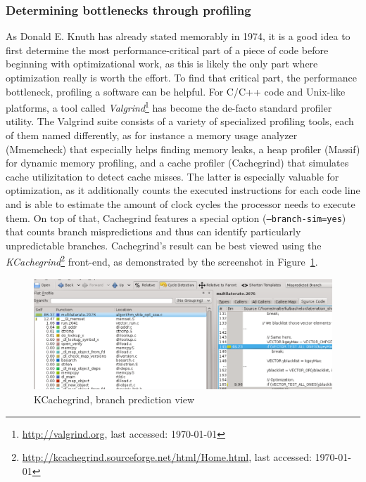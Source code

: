 \subsubsection{Determining bottlenecks through profiling}
As Donald E. Knuth has already stated memorably in 1974, it is a good idea to first determine the most performance-critical part of a piece of code before beginning with optimizational work, as this is likely the only part where optimization really is worth the effort. To find that critical part, the performance bottleneck, profiling a software can be helpful. For C/C++ code and Unix-like platforms, a tool called \emph{Valgrind}\footnote{\url{http://valgrind.org}, last accessed: \today{}} has become the de-facto standard profiler utility. The Valgrind suite consists of a variety of specialized profiling tools, each of them named differently, as for instance a memory usage analyzer (Mmemcheck) that especially helps finding memory leaks, a heap profiler (Massif) for dynamic memory profiling, and a cache profiler (Cachegrind) that simulates cache utilizitation to detect cache misses. The latter is especially valuable for optimization, as it additionally counts the executed instructions for each code line and is able to estimate the amount of clock cycles the processor needs to execute them. On top of that, Cachegrind features a special option (\texttt{--branch-sim=yes}) that counts branch mispredictions and thus can identify particularly unpredictable branches. Cachegrind's result can be best viewed using the \emph{KCachegrind}\footnote{\url{http://kcachegrind.sourceforge.net/html/Home.html}, last accessed: \today{}} front-end, as demonstrated by the screenshot in Figure~\ref{fig:kcachegrind}.
\begin{figure}[h]
\begin{center}
\includegraphics[width=14cm]{img/kcachegrind}
\end{center}
\caption{KCachegrind, branch prediction view}
\label{fig:kcachegrind}
\end{figure}

